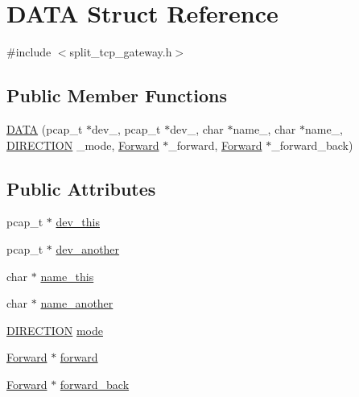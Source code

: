 \hypertarget{structDATA}{\section{\-D\-A\-T\-A \-Struct \-Reference}
\label{structDATA}
}


{\ttfamily \#include $<$split\-\_\-tcp\-\_\-gateway.\-h$>$}

\subsection*{\-Public \-Member \-Functions}
\begin{DoxyCompactItemize}
\item 
\hyperlink{structDATA_a9ab2df800d4d701a6aa6baa28b7757aa}{\-D\-A\-T\-A} (pcap\-\_\-t $\ast$dev\-\_, pcap\-\_\-t $\ast$dev\-\_, char $\ast$name\-\_, char $\ast$name\-\_, \hyperlink{split__tcp__gateway_8h_aa268a41a13430b18e933ed40207178d0}{\-D\-I\-R\-E\-C\-T\-I\-O\-N} \-\_\-mode, \hyperlink{structForward}{\-Forward} $\ast$\-\_\-forward, \hyperlink{structForward}{\-Forward} $\ast$\-\_\-forward\-\_\-back)
\end{DoxyCompactItemize}
\subsection*{\-Public \-Attributes}
\begin{DoxyCompactItemize}
\item 
pcap\-\_\-t $\ast$ \hyperlink{structDATA_a2b6e3861cd032d77e6bcede1ce8eac80}{dev\-\_\-this}
\item 
pcap\-\_\-t $\ast$ \hyperlink{structDATA_ad6cc6765ab22cb11a31b8b51d6449a41}{dev\-\_\-another}
\item 
char $\ast$ \hyperlink{structDATA_af8b5b656a5e237ad7d2f5cdcca9fcce4}{name\-\_\-this}
\item 
char $\ast$ \hyperlink{structDATA_a81d07e70e9d1fdabf83cacd194606190}{name\-\_\-another}
\item 
\hyperlink{split__tcp__gateway_8h_aa268a41a13430b18e933ed40207178d0}{\-D\-I\-R\-E\-C\-T\-I\-O\-N} \hyperlink{structDATA_ae913982f5e9e79eb6da5ca9f4b43c753}{mode}
\item 
\hyperlink{structForward}{\-Forward} $\ast$ \hyperlink{structDATA_a36334fad8e030681cdad1878a05c11f3}{forward}
\item 
\hyperlink{structForward}{\-Forward} $\ast$ \hyperlink{structDATA_ac695dab2d15b6a320ba208820d89fe8b}{forward\-\_\-back}
\end{DoxyCompactItemize}


